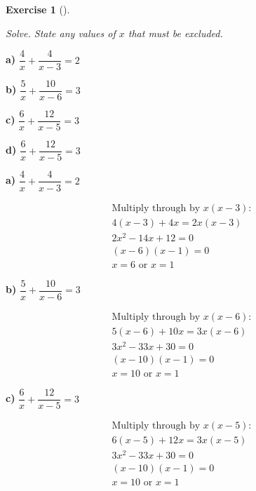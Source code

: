 \documentclass[
  letterpaper,
  DIV=11,
  numbers=noendperiod]{scrreprt}
\theoremstyle{definition}
\newtheorem{exercise}{Exercise}[chapter]
\theoremstyle{remark}
\begin{document}
\begin{exercise}[]\protect\hypertarget{exr-u6-33}{}\label{exr-u6-33}

\emph{Solve. State any values of \(x\) that must be excluded.}

\textbf{a)} \(\displaystyle \dfrac{4}{x} + \dfrac{4}{x - 3} = 2\)

\textbf{b)} \(\displaystyle \dfrac{5}{x} + \dfrac{10}{x - 6} = 3\)

\textbf{c)} \(\displaystyle \dfrac{6}{x} + \dfrac{12}{x - 5} = 3\)

\textbf{d)} \(\displaystyle \dfrac{6}{x} + \dfrac{12}{x - 5} = 3\)

\begin{tcolorbox}[enhanced jigsaw, opacitybacktitle=0.6, coltitle=black, arc=.35mm, colframe=quarto-callout-tip-color-frame, colback=white, bottomrule=.15mm, left=2mm, colbacktitle=quarto-callout-tip-color!10!white, titlerule=0mm, opacityback=0, title=\textcolor{quarto-callout-tip-color}{\faLightbulb}\hspace{0.5em}{🔍 View Solutions}, leftrule=.75mm, breakable, rightrule=.15mm, bottomtitle=1mm, toptitle=1mm, toprule=.15mm]

\textbf{a)} \(\displaystyle \dfrac{4}{x} + \dfrac{4}{x - 3} = 2\)

\begin{align*}
\text{Multiply through by } x(x - 3): \\ 4(x - 3) + 4x = 2x(x - 3) \\ 2x^2 - 14x + 12 = 0 \\ (x - 6)(x - 1) = 0 \\ x = 6 \text{ or } x = 1
\end{align*}

\textbf{b)} \(\displaystyle \dfrac{5}{x} + \dfrac{10}{x - 6} = 3\)

\begin{align*}
\text{Multiply through by } x(x - 6): \\ 5(x - 6) + 10x = 3x(x - 6) \\ 3x^2 - 33x + 30 = 0 \\ (x - 10)(x - 1) = 0 \\ x = 10 \text{ or } x = 1
\end{align*}

\textbf{c)} \(\displaystyle \dfrac{6}{x} + \dfrac{12}{x - 5} = 3\)

\begin{align*}
\text{Multiply through by } x(x - 5): \\ 6(x - 5) + 12x = 3x(x - 5) \\ 3x^2 - 33x + 30 = 0 \\ (x - 10)(x - 1) = 0 \\ x = 10 \text{ or } x = 1
\end{align*}


\end{tcolorbox}
\end{exercise}
\end{document}
